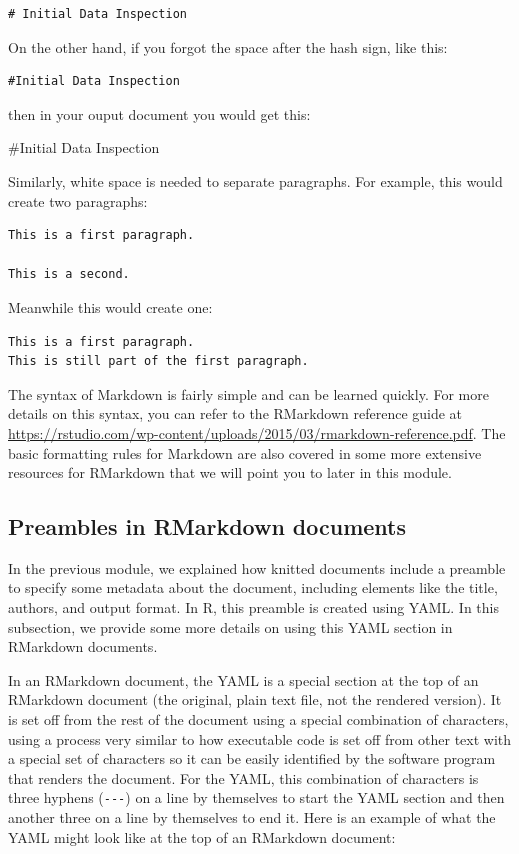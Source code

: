 \documentclass[]{tufte-book}
\begin{document}
\begin{verbatim}
# Initial Data Inspection
\end{verbatim}

On the other hand, if you forgot the space after the hash sign, like this:

\begin{verbatim}
#Initial Data Inspection
\end{verbatim}

then in your ouput document you would get this:

\#Initial Data Inspection

Similarly, white space is needed to separate paragraphs. For example, this would create two paragraphs:

\begin{verbatim}
This is a first paragraph. 

This is a second.
\end{verbatim}

Meanwhile this would create one:

\begin{verbatim}
This is a first paragraph.
This is still part of the first paragraph.
\end{verbatim}

The syntax of Markdown is fairly simple and can be learned quickly. For more
details on this syntax, you can refer to the RMarkdown reference guide at
\url{https://rstudio.com/wp-content/uploads/2015/03/rmarkdown-reference.pdf}. The
basic formatting rules for Markdown are also covered in some more
extensive resources for RMarkdown that we will point you to later in this
module.

\subsection{Preambles in RMarkdown documents}\label{preambles-in-rmarkdown-documents}

In the previous module, we explained how knitted documents include a
preamble to specify some metadata about the document, including elements
like the title, authors, and output format. In R, this preamble is
created using YAML. In this subsection, we provide some more details
on using this YAML section in RMarkdown documents.

In an RMarkdown document, the YAML is a special section
at the top of an RMarkdown document (the original, plain text file, not the
rendered version). It is set off from the rest of the document using a special
combination of characters, using a process very similar to how executable code
is set off from other text with a special set of characters so it can be easily
identified by the software program that renders the document. For the YAML, this
combination of characters is three hyphens (\texttt{-\/-\/-}) on a line by themselves to
start the YAML section and then another three on a line by themselves to end it.
Here is an example of what the YAML might look like at the top of an RMarkdown
document:
\end{document}
